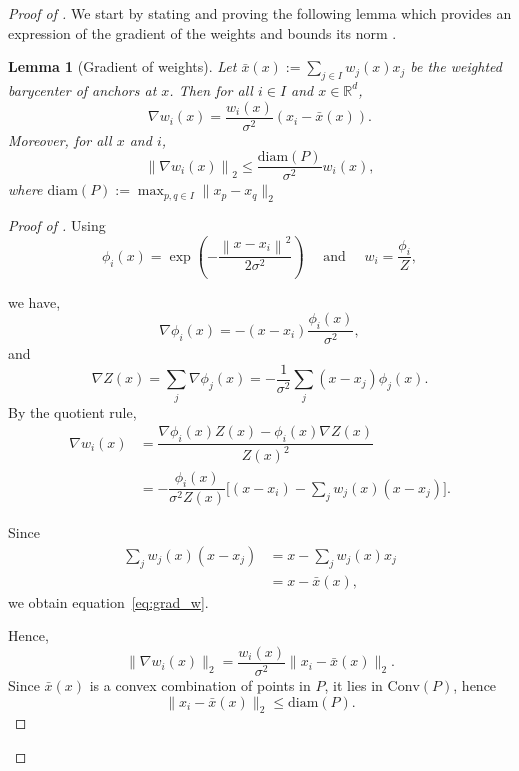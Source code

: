 \documentclass{article} %
\def\eqref#1{equation~\ref{#1}}
\newcommand{\R}{\mathbb{R}}
\newcommand{\diam}{\mathrm{diam}}
\newcommand*{\norm}[1]{\left\|#1\right\|}
\theoremstyle{plain}
\newtheorem{lemma}[theorem]{Lemma}
\theoremstyle{definition}
\theoremstyle{remark}
\begin{document}
\begin{proof}[Proof of ]

We start by stating and proving the following lemma which provides an expression of the gradient of the weights and bounds its norm .



\begin{lemma}[Gradient of weights]
\label{lem:grad_weights}
Let $\bar x(x):=\sum_{j \in I} w_j(x) x_j$ be the weighted barycenter of anchors at $x$.
Then for all $i \in I$ and $x \in \R^d$,
\begin{equation} \label{eq:grad_w}
    \nabla w_i(x) = \frac{w_i(x)}{\sigma^2} \left( x_i - \bar x(x) \right).
\end{equation}
Moreover, for all $x$ and $i$,
    \[ \norm{\nabla w_i(x)}_2 \le \frac{\diam(P)}{\sigma^2}w_i(x), \]
where $\diam(P) := \max_{p,q\in I}\|x_p - x_q\|_2$
\end{lemma} 

\begin{proof}[Proof of ]
Using 
    \[\phi_i(x) = \exp\left(- \dfrac{\norm{x - x_i}^2}{2 \sigma^2} \right) \quad \text{ and } \quad w_i= \dfrac{\phi_i}{Z}, \]

we have, 
    \[ \nabla\phi_i(x) = - ( x - x_i ) \frac{\phi_i(x)}{\sigma^2} , \] 
and
    \[\nabla Z(x) = \sum_j \nabla \phi_j(x) = - \dfrac{1}{\sigma^2}  \sum_j ( x -x_j ) \phi_j(x). \]
By the quotient rule,
\begin{align*}
   \nabla w_i(x)& =\dfrac{\nabla\phi_i(x) Z(x)-\phi_i(x)\nabla Z(x)}{Z(x)^2} \\ &= -\dfrac{\phi_i(x)}{\sigma^2 Z(x)}
\Big[(x-x_i)-\sum_j w_j(x)(x-x_j)\Big]. 
\end{align*}

Since 
\begin{align*}
    \sum_j w_j(x)(x-x_j) &= x-\sum_j w_j(x)x_j
    \\ &=x-\bar x(x),
\end{align*} 
we obtain \eqref{eq:grad_w}.


Hence, 
    \[ \|\nabla w_i(x)\|_2 = \dfrac{w_i(x)}{\sigma^2}\|x_i-\bar x(x)\|_2. \]
Since $\bar x(x)$ is a convex combination of points in $P$, it lies in $\mathrm{Conv}(P)$, hence 
    \[ \|x_i-\bar x(x)\|_2 \le \diam(P). \]

\end{proof}




\end{proof}
\end{document}
